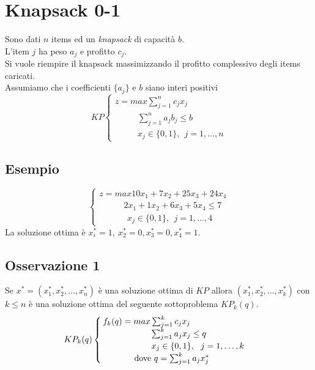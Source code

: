 \section{Knapsack 0-1}
Sono dati $n$ items ed un \textit{knapsack} di capacità $b$.\\
L'item $j$ ha peso $a_{j}$ e profitto $c_{j}$.\\
Si vuole riempire il knapsack massimizzando il profitto complessivo degli items caricati.\\
Assumiamo che i coefficienti $\{a_{j}\}$ e $b$ siano interi positivi
\begin{equation*}
	KP
	\begin{cases}
		z = max\sum_{j=1}^{n}c_{j}x_{j} \\
		\ \ \ \ \ \ \ \ \ \ \ \ \sum_{j=1}^{n}a_{j}b_{j}\le b \\
		\ \ \ \ \ \ \ \ \ \ \ \ x_{j}\in\{0,1\},\ \ j=1,\dots,n
	\end{cases}
\end{equation*}

\subsection{Esempio}
\begin{displaymath}
	\begin{cases}
		z=max 10x_{1}+7x_{2}+25x_{3}+24x_{4}\\
		\ \ \ \ \ \ \ \ \ \ \ \ \ 2x_{1}+1x_{2}+6x_{3}+5x_{4}\le 7 \\
		\ \ \ \ \ \ \ \ \ \ \ \ \ \ \,x_{j}\in\{0,1\},\ \ j=1,\dots,4
	\end{cases}
\end{displaymath}
La soluzione ottima è $x_{i}^{*}=1,\ x_{2}^{*}=0,x_{3}^{*}=0,x_{4}^{*}=1$.

\subsection{Osservazione 1}\label{ss:osservazione_1}
Se $x^{*}=(x_{1}^{*},x_{2}^{*},\dots,x_{n}^{*})$ è una soluzione ottima di $KP$ allora $(x_{1}^{*},x_{2}^{*},\dots,x_{k}^{*})$ con $k\le n$ è una soluzione ottima del seguente sottoproblema $KP_{k}(q)$.
\begin{equation*}
	KP_{k}(q)
	\begin{cases}
		f_{k}(q)=max\sum_{j=1}^{k}c_{j}x_{j}\\
		\ \ \ \ \ \ \ \ \ \ \ \ \ \ \ \ \ \sum_{j=1}^{k}a_{j}x_{j}\le q \\
		\ \ \ \ \ \ \ \ \ \ \ \ \ \ \ \ \ x_{j}\in\{0,1\},\ \ j=1,\dots,k \\
		\ \ \ \ \ \ \ \ \ \ \textnormal{ dove }q=\sum_{j=1}^{k}a_{j}x_{j}^{*}
	\end{cases}
\end{equation*}
\clearpage
